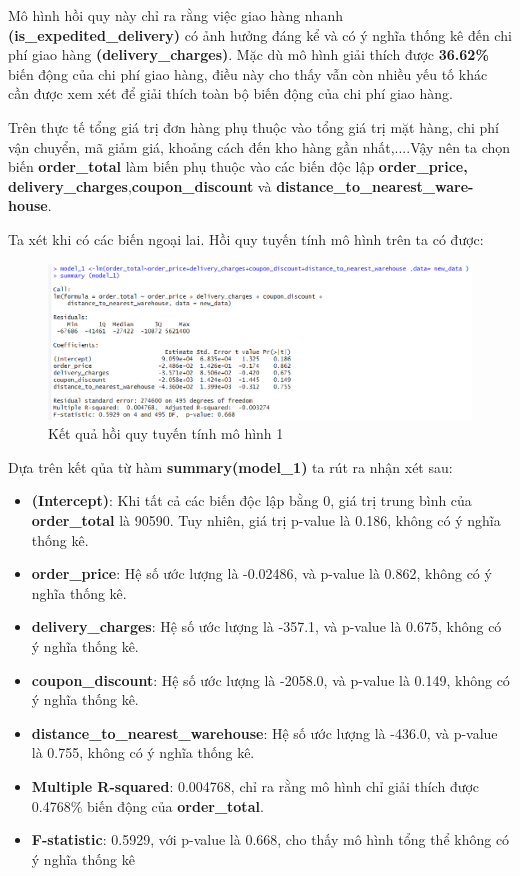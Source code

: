  Mô hình hồi quy này chỉ ra rằng việc giao hàng nhanh \textbf{(is\_expedited\_delivery)} có ảnh hưởng đáng kể và có ý nghĩa thống kê đến chi phí giao hàng \textbf{(delivery\_charges)}. Mặc dù mô hình giải thích được \textbf{36.62\%} biến động của chi phí giao hàng, điều này cho thấy vẫn còn nhiều yếu tố khác cần được xem xét để giải thích toàn bộ biến động của chi phí giao hàng.

Trên thực tế tổng giá trị đơn hàng phụ thuộc vào tổng giá trị mặt hàng, chi phí vận chuyển, mã giảm giá, khoảng cách đến kho hàng gần nhất,....Vậy nên ta chọn biến \textbf{order\_total} làm biến phụ thuộc vào các biến độc lập \textbf{order\_price, delivery\_charges},\textbf{coupon\_discount} và \textbf{distance\_to\_nearest\_ware-house}.

Ta xét khi có các biến ngoại lai. Hồi quy tuyến tính mô hình trên ta có được:
\begin{figure}[H]
  \centering
  \includegraphics[width=0.7\linewidth]{graphics/5.5.2.png}
  \caption{Kết quả hồi quy tuyến tính mô hình 1 }
\end{figure}

Dựa trên kết qủa từ hàm \textbf{summary(model\_1)} ta rút ra nhận xét sau:
\begin{itemize}
\item \textbf{(Intercept)}: Khi tất cả các biến độc lập bằng 0, giá trị trung bình của \textbf{order\_total} là 90590. Tuy nhiên, giá trị p-value là 0.186, không có ý nghĩa thống kê.
\item \textbf{order\_price}: Hệ số ước lượng là -0.02486, và p-value là 0.862, không có ý nghĩa thống kê.
\item \textbf{delivery\_charges}: Hệ số ước lượng là -357.1, và p-value là 0.675, không có ý nghĩa thống kê.
\item \textbf{coupon\_discount}: Hệ số ước lượng là -2058.0, và p-value là 0.149, không có ý nghĩa thống kê.
\item \textbf{distance\_to\_nearest\_warehouse}: Hệ số ước lượng là -436.0, và p-value là 0.755, không có ý nghĩa thống kê.
\item\textbf{Multiple R-squared}: 0.004768, chỉ ra rằng mô hình chỉ giải thích được 0.4768\% biến động của \textbf{order\_total}.
\item\textbf{F-statistic}: 0.5929, với p-value là 0.668, cho thấy mô hình tổng thể không có ý nghĩa thống kê
\end{itemize}

